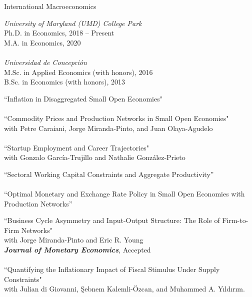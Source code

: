 \documentclass[10pt]{article}
\begin{document}
\begin{description}[leftmargin=10em,style=nextline]
    \item[Research Interests] International Macroeconomics
    \item[Education] {\itshape University of Maryland (UMD) College Park}\\
    Ph.D. in Economics, 2018 --  Present\\
    M.A. in Economics, 2020\\ 
    \\[-0.1in]
{\itshape Universidad de Concepci\'on}\\
M.Sc. in Applied Economics (with honors), 2016 \\
B.Sc. in Economics (with honors), 2013\\[-.1in]
    \item[Working Papers] 
    ``Inflation in Disaggregated Small Open Economies"\\
    \\[-0.1in]
    ``Commodity Prices and Production Networks in Small Open Economies"\\
     with Petre Caraiani, Jorge Miranda-Pinto, and Juan Olaya-Agudelo\\
    \\[-0.1in]
      ``Startup Employment and Career Trajectories"\\
     with Gonzalo Garc\'ia-Trujillo and Nathalie Gonz\'alez-Prieto\\
     \item[Work in Progress] ``Sectoral Working Capital Constraints and Aggregate Productivity''\\ \\[-0.1in]
     ``Optimal Monetary and Exchange Rate Policy in Small Open Economies with Production Networks''\\[-.1in]
     \item[Published Papers ] ``Business Cycle Asymmetry and Input-Output Structure: The Role of Firm-to-Firm Networks"\\
     with Jorge Miranda-Pinto and Eric R. Young\\
     \textbf{\textit{Journal of Monetary Economics}}, Accepted\\
     \\[-0.1in]
     ``Quantifying the Inflationary Impact of Fiscal Stimulus Under Supply Constraints"\\
      with Julian di Giovanni, \c{S}ebnem Kalemli-\"{O}zcan, and Muhammed A. Y{\i}ld{\i}r{\i}m. \\

\end{description}
\end{document}
